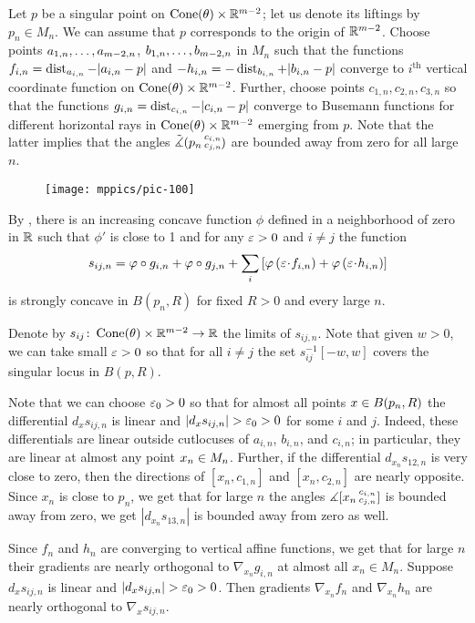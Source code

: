 Let $p$ be a singular point on $\operatorname{Cone}(\theta)\times \mathbb{R}^{m-2}$;
let us denote its liftings by $p_n\in M_n$.
We can assume that $p$ corresponds to the origin of $\mathbb{R}^{m-2}$.
Choose points $a_{1,n},\zz\dots,a_{m-2,n}$, $b_{1,n},\zz\dots,b_{m-2,n}$ in $M_n$ such that the functions $f_{i,n}\zz=\dist_{a_{i,n}}\zz-|a_{i,n}-p|$ and $-h_{i,n}\zz=-\dist_{b_{i,n}}+|b_{i,n}-p|$ converge to $i^{\text{th}}$ vertical coordinate function on $\Cone(\theta)\zz\times \RR^{m-2}$.
Further, choose points $c_{1,n},c_{2,n},c_{3,n}$ so that the functions $g_{i,n}\zz=\dist_{c_{i,n}}-|c_{i,n}-p|$ converge to Busemann functions for different horizontal rays in $\operatorname{Cone}(\theta)\times \mathbb{R}^{m-2}$ emerging from $p$.
Note that the latter implies that the angles $\tilde\measuredangle(p_n\,{}^{c_{i,n}}_{c_{j,n}}\hspace{-0.2ex})$ are bounded away from zero for all large~$n$.

\begin{wrapfigure}{r}{35 mm}
\vskip-0mm
\centering
\texttt{[image: mppics/pic-100]}
\vskip0mm
\end{wrapfigure}

By \cite[Lemma 7.2.1]{petrunin-conc}, there is an increasing concave function $\phi$ defined in a neighborhood of zero in $\mathbb{R}$ such that $\phi'$ is close to 1 and for any $\varepsilon>0$ and $i\ne j$ the function 
\[s_{ij,n}
=
\phi\circ g_{i,n}
+
\phi\circ g_{j,n}
+
\sum_i\left[\phi\left(\eps\cdot f_{i,n}\right)+\phi\left(\eps\cdot h_{i,n}\right)\right]\]
is strongly concave in $B(p_n,R)$ for fixed $R>0$ and every large $n$.

Denote by $s_{ij}\:\Cone(\theta)\zz\times \RR^{m-2}\zz\to \RR$ the limits of $s_{ij,n}$.
Note that given $w>0$, we can take small $\varepsilon>0$ so that for all $i\ne j$ the set $s_{ij}^{-1}[-w,w]$ covers the singular locus in $B(p,R)$. 

Note that we can choose $\varepsilon_0>0$ so that for almost all points $x\zz\in B(p_n,R)$ 
the differential $d_xs_{ij,n}$ is linear and $|d_xs_{ij,n}|>\eps_0>0$ for some $i$ and $j$.
Indeed, these differentials are linear outside cutlocuses of $a_{i,n}$, $b_{i,n}$, and $c_{i,n}$;
in particular, they are linear at almost any point $x_n\zz\in M_n$.
Further, if the differential $d_{x_n}s_{12,n}$ is very close to zero,
then the directions of $[x_n,c_{1,n}]$ and $[x_n,c_{2,n}]$ are nearly opposite.
Since $x_n$ is close to $p_n$, we get that for large $n$ the angles $\measuredangle[x_n\,{}^{c_{i,n}}_{c_{j,n}}]$ is bounded away from zero, we get $|d_{x_n}s_{13,n}|$ is bounded away from zero as well.

Since $f_n$ and $h_n$ are converging to vertical affine functions, we get that for large $n$ their gradients are nearly orthogonal to $\nabla_{x_n} g_{i,n}$ at almost all $x_n\in M_n$.
Suppose $d_xs_{ij,n}$ is linear and $|d_xs_{ij,n}|>\eps_0>0$.
Then gradients $\nabla_{x_n}f_n$ and $\nabla_{x_n}h_n$ are nearly orthogonal to $\nabla_x s_{ij,n}$.

